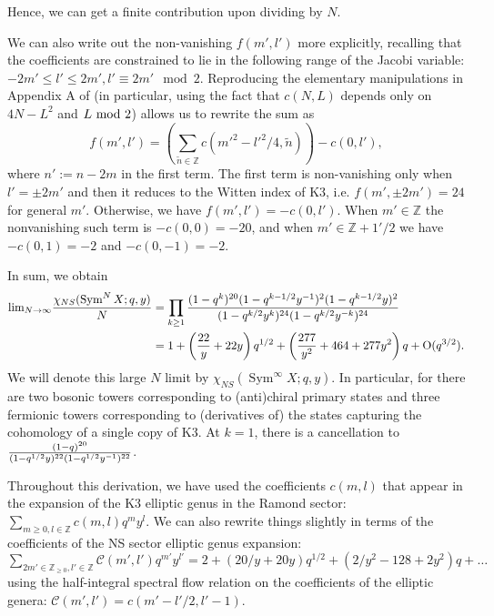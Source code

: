 \documentclass[11pt]{amsart}
\newcommand{\Z}{\mathbb Z}
\DeclareMathOperator{\Sym}{Sym} \DeclareMathOperator{\Hom}{Hom}
\theoremstyle{thm}
\numberwithin{equation}{subsection}
\theoremstyle{def}
\theoremstyle{rem}
\begin{document}
Hence, we can get a finite contribution upon dividing by $N$. 

We can also write out the non-vanishing $f(m', l')$ more explicitly, recalling that the coefficients are constrained to lie in the following range of the Jacobi variable: $-2m' \leq l' \leq 2m', l' \equiv 2 m' \mod 2$. Reproducing the elementary manipulations in Appendix A of \cite{BKKP} (in particular, using the fact that $c(N, L)$ depends only on $4N-L^2$ and $L \ {\rm mod} \ 2$) allows us to rewrite the sum as
\begin{equation}\label{eq:fml2}
f(m', l') = \left( \sum_{\tilde{n} \in \Z}c(m'^2 - l'^2/4, \tilde{n}) \right) - c(0, l'),
\end{equation} where $n':= n - 2m$ in the first term. 
The first term is non-vanishing only when $l' = \pm 2 m'$ and then it reduces to the Witten index of K3, i.e. $f(m', \pm 2m') = 24$ for general $m'$. Otherwise, we have $f(m', l') = -c(0, l')$. When $m' \in \mathbb{Z}$ the nonvanishing such term is $-c(0, 0) = -20$, and when $m' \in \Z + 1'/2$ we have $-c(0, 1) = -2$ and $-c(0, -1) = -2$. 

In sum, we obtain
\begin{align*}
{\rm lim}_{N \rightarrow \infty}{\chi_{NS}(\Sym^{N} X; q, y) \over N} &= \prod_{k \geq 1}{(1 - q^k)^{20}(1 - q^{k-1/2}y^{-1})^2(1 - q^{k-1/2}y)^2 \over (1 - q^{k/2}y^k)^{24}(1 - q^{k/2}y^{-k})^{24}} \\
&= 1 + \left({22 \over y} + 22 y \right)q^{1/2} + \left({277 \over y^2} + 464 + 277 y^2 \right)q + \text{O}(q^{3/2}).
\end{align*} 
We will denote this large $N$ limit by $\chi_{NS}(\Sym^\infty X ; q,y)$. 
In particular, for there are two bosonic towers corresponding to (anti)chiral primary states and three fermionic towers corresponding to (derivatives of) the states capturing the cohomology of a single copy of K3. At $k=1$, there is a cancellation to ${(1 - q)^{20} \over (1 - q^{1/2}y)^{22}(1 - q^{1/2}y^{-1})^{22}}$.

Throughout this derivation, we have used the coefficients $c(m, l)$ that appear in the expansion of the K3 elliptic genus in the Ramond sector: $\sum_{m \geq 0, l \in \mathbb{Z}} c(m, l) q^m y^l$. We can also rewrite things slightly in terms of the coefficients of the NS sector elliptic genus expansion: $\sum_{2 m' \in \mathbb{Z}_{\geq 0}, l' \in \mathbb{Z}} \mathcal{C}(m', l') q^{m'} y^{l'} = 2 + (20/y + 20 y)q^{1/2} + (2/y^2 - 128 + 2 y^2)q + \ldots$ using the half-integral spectral flow relation on the coefficients of the elliptic genera: $\mathcal{C}(m', l') = c(m'-l'/2, l'-1)$. 
\end{document}
